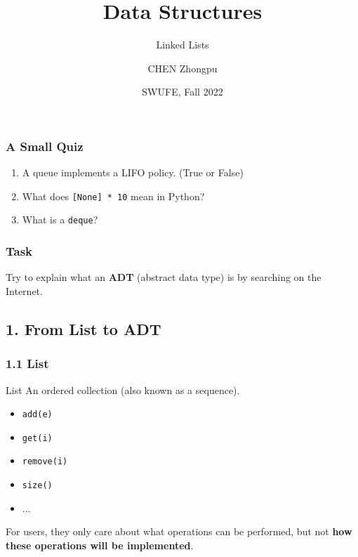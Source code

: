 \documentclass[aspectratio=169, 14pt]{beamer}
\title[Data Structures] %
{Data Structures}
\subtitle{Linked Lists}
\author[CHEN Zhongpu] %
{CHEN Zhongpu}
\institute[] %
{
  School of Computing and Artificial Intelligence \\
  \href{mailto:zpchen@swufe.edu.cn}{zpchen@swufe.edu.cn}
}
\date[] %
{SWUFE, Fall 2022}
\begin{document}
\frame{\titlepage}

\begin{frame}
\frametitle{A Small Quiz}
\begin{enumerate}
    \item A queue implements a LIFO policy. (True or False)
    \item What does \texttt{[None] * 10} mean in Python?
    \item What is a \texttt{deque}?
\end{enumerate}
\end{frame}

\begin{frame}
    \frametitle{Task}
Try to explain what an \textbf{ADT} (abstract data type) is by searching on the Internet.
    

\end{frame}

{
    \begin{frame}
        \section{\textcolor{darkmidnightblue}{1. From List to ADT}}
    \end{frame}

}

\begin{frame}
    \frametitle{1.1 List}

\begin{exampleblock}{List}
An ordered collection (also known as a sequence).
\end{exampleblock} 

\begin{itemize}
    \item \texttt{add(e)}
    \item \texttt{get(i)}
    \item \texttt{remove(i)}
    \item \texttt{size()}
    \item ...
\end{itemize}
\pause
For users, they only care about what operations can be performed, but not \textbf{how these operations will be implemented}.

\end{frame}
\end{document}
